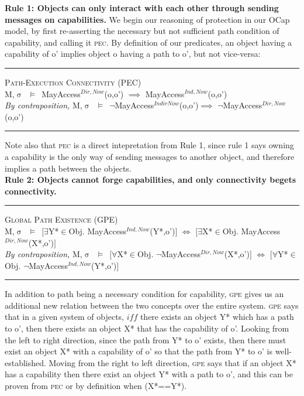 \documentclass[a4paper,11pt, twoside,twocolumn]{article}
\newenvironment{logic}[1][null]
{\begin{flushleft} \small \label{#1}}
{\end{flushleft}}
\newcommand{\loin}{$\in$}
\newcommand{\loforall}{$\forall$}
\newcommand{\loexists}{$\exists$}
\newcommand{\loimplies}{$\implies$}
\newcommand{\losigma}{$\upsigma$}
\newcommand{\loturns} {$\vDash$}
\newcommand{\loiff} {$\iff$}
\newcommand{\loneg}{$\boldsymbol \neg$}
\newcommand{\ablock} {\null\qquad}
\begin{document}
\textbf{Rule 1: Objects can only interact with each other through sending messages on capabilities.}
We begin our reasoning of protection in our OCap model, by first re-asserting the necessary but not sufficient path condition of capability, and calling it \textsc{pec}. By definition of our predicates, an object having a capability of o' implies object o having a path to o', but not vice-versa:
\begin{logic}
\hrule\null
\textsc{\normalsize *Path-Execution Connectivity (PEC)}\\
M,\losigma\ \loturns\ MayAccess$^{Dir,Now}$(o,o') \loimplies \linebreak
\ablock \ablock  MayAccess$^{Ind,Now}$(o,o')
\linebreak \\
\textit{By contraposition,}\linebreak
M,\losigma\ \loturns\ \loneg MayAccess$^{Indir Now}$(o,o')\loimplies \linebreak
\ablock \ablock \loneg MayAccess$^{Dir,Now}$(o,o')
\linebreak
\hrule
\end{logic}
Note also that \textsc{pec} is a direct intepretation from Rule 1, since rule 1 says owning a capability is the only way of sending messages to another object, and therefore implies a path between the objects.\\

\textbf{Rule 2: Objects cannot forge capabilities, and only connectivity begets connectivity.}
\begin{logic}
\hrule\null
\textsc{\normalsize *Global Path Existence (GPE)}\\
M,\losigma\ \loturns\ $[$\loexists Y*\loin{Obj}. MayAccess$^{Ind,Now}$(Y*,o')$]$\linebreak
\ablock \loiff\linebreak
\ablock $[$\loexists X*\loin{Obj}. MayAccess$^{Dir,Now}$(X*,o')$]$
\linebreak\\
\textit{By contraposition,}\linebreak
M,\losigma\ \loturns\ $[$\loforall X*\loin{Obj}. \loneg MayAccess$^{Dir,Now}$(X*,o')$]$\linebreak
\ablock \loiff\linebreak
\ablock $[$\loforall Y*\loin{Obj}. \loneg MayAccess$^{Ind,Now}$(Y*,o')$]$\linebreak
\hrule
\end{logic}
In addition to path being a necessary condition for capability, \textsc{gpe} gives us an additional new relation between the two concepts over the entire system. \textsc{gpe} says that in a given system of objects, $iff$ there exists an object Y* which has a path to o', then there exists an object X* that has the capability of o'. Looking from the left to right direction, since the path from Y* to o' exists, then there must exist an object X* with a capability of o' so that the path from Y* to o' is well-established. Moving from the right to left direction, \textsc{gpe} says that if an object X* has a capability then there exist an object Y* with a path to o', and this can be proven from \textsc{pec} or by definition when (X*==Y*).\\
\end{document}
